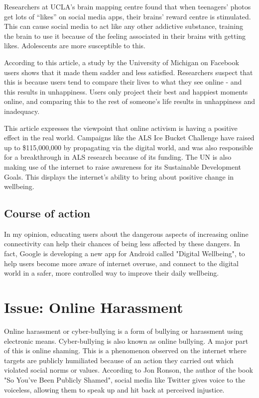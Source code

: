 \documentclass[a4paper, 11pt]{article}
\begin{document}
      Researchers at UCLA’s brain mapping centre found that when teenagers’ photos get lots of “likes” on social media apps, their brains’ reward centre is stimulated.\cite{teens-social-media-brain} This can cause social media to act like any other addictive substance, training the brain to use it because of the feeling associated in their brains with getting likes. Adolescents are more susceptible to this.

      According to this article, a study by the University of Michigan on Facebook users shows that it made them sadder and less satisfied.\cite{facebook-sad} Researchers suspect that this is because users tend to compare their lives to what they see online - and this results in unhappiness. Users only project their best and happiest moments online, and comparing this to the rest of someone's life results in unhappiness and inadequacy.

      This article expresses the viewpoint that online activism is having a positive effect in the real world.\cite{nytimes-connectedness} Campaigns like the ALS Ice Bucket Challenge have raised up to \$115,000,000 by propagating via the digital world, and was also responsible for a breakthrough in ALS research because of its funding. The UN is also making use of the internet to raise awareness for its Sustainable Development Goals.\cite{als-wiki, als-challenge} This displays the internet's ability to bring about positive change in wellbeing.

  \subsection{Course of action}

    In my opinion, educating users about the dangerous aspects of increasing online connectivity can help their chances of being less affected by these dangers. In fact, Google is developing a new app for Android called "Digital Wellbeing", to help users become more aware of internet overuse, and connect to the digital world in a safer, more controlled way to improve their daily wellbeing.

\section{Issue: Online Harassment}

  Online harassment or cyber-bullying is a form of bullying or harassment using electronic means. Cyber-bullying is also known as online bullying. A major part of this is online shaming. This is a phenomenon observed on the internet where targets are publicly humiliated because of an action they carried out which violated social norms or values. According to Jon Ronson, the author of the book "So You've Been Publicly Shamed", social media like Twitter gives voice to the voiceless, allowing them to speak up and hit back at perceived injustice. \cite{jon-ronson-book, jon-ronson-ted-talk}
\end{document}
